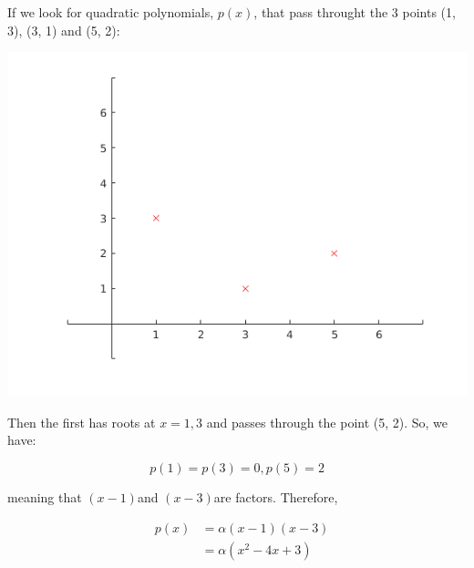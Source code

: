 \documentclass[MathsNotesBase.tex]{subfiles}
\date{\vspace{-6ex}}
\begin{document}

\begin{par}
\begin{flushleft}
If we look for quadratic polynomials, $p\left(x\right)$, that pass throught the 3 points (1, 3), (3, 1) and (5, 2):
\end{flushleft}
\end{par}

\begin{center}
\includegraphics[width=\linewidth]{figure_0}
\end{center}


\begin{par}
\begin{flushleft}
Then the first has roots at $x=1,3$ and passes through the point (5, 2). So, we have:
\end{flushleft}
\end{par}

\begin{par}
$$p(1)=p(3)=0, p(5) = 2$$
\end{par}

\begin{par}
\begin{flushleft}
meaning that $\left(x-1\right)$and $\left(x-3\right)$are factors. Therefore,
\end{flushleft}
\end{par}

\begin{par}
$$\begin{array}{lcr}
&p(x) &= \alpha(x-1)(x-3)\\
&&= \alpha(x^2-4x+3)
\end{array}$$
\end{par}
\end{document}
